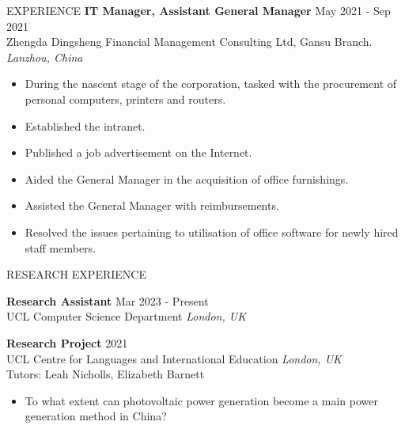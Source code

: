 \documentclass{resume} %
\begin{document}
\begin{rSection}{EXPERIENCE}
\textbf{IT Manager, Assistant General Manager} \hfill May 2021 - Sep 2021\\
Zhengda Dingsheng Financial Management Consulting Ltd, Gansu Branch. \hfill \textit{Lanzhou, China}
\begin{itemize}
    \itemsep -3pt {} 
    \item During the nascent stage of the corporation, tasked with the procurement of personal computers, printers and routers.
    \item Established the intranet.
    \item Published a job advertisement on the Internet.
    \item Aided the General Manager in the acquisition of office furnishings.
    \item Assisted the General Manager with reimbursements.
    \item Resolved the issues pertaining to utilisation of office software for newly hired staff members.
\end{itemize}

\end{rSection} 

\begin{rSection}{RESEARCH EXPERIENCE}

\textbf{Research Assistant} \hfill Mar 2023 - Present\\
UCL Computer Science Department \hfill \textit{London, UK}

\textbf{Research Project} \hfill 2021\\
UCL Centre for Languages and International Education \hfill \textit{London, UK}\\
Tutors: Leah Nicholls, Elizabeth Barnett
\begin{itemize}
    \itemsep -3pt {} 
    \item To what extent can photovoltaic power generation become a main power generation method in China?
\end{itemize}

\end{rSection}
\end{document}
